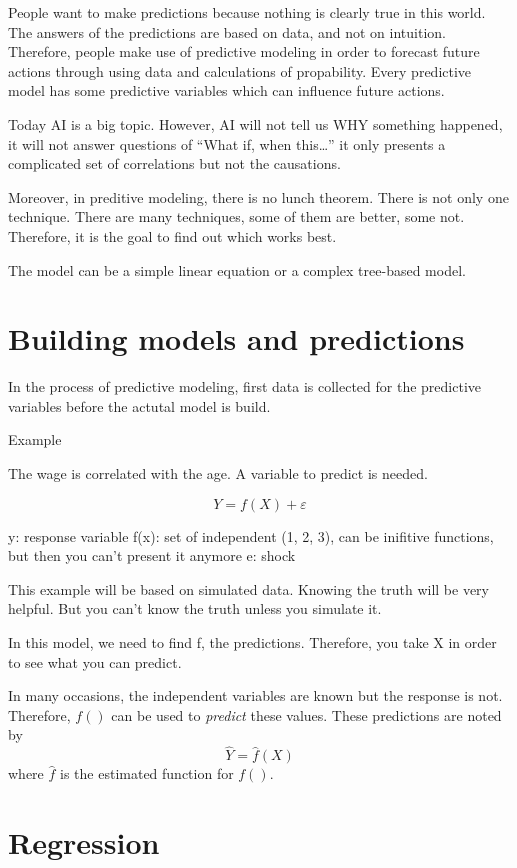 \documentclass[]{report}
\begin{document}
People want to make predictions because nothing is clearly true in this
world. The answers of the predictions are based on data, and not on
intuition. Therefore, people make use of predictive modeling in order to
forecast future actions through using data and calculations of
propability. Every predictive model has some predictive variables which
can influence future actions.

Today AI is a big topic. However, AI will not tell us WHY something
happened, it will not answer questions of ``What if, when this\ldots{}''
it only presents a complicated set of correlations but not the
causations.

Moreover, in preditive modeling, there is no lunch theorem. There is not
only one technique. There are many techniques, some of them are better,
some not. Therefore, it is the goal to find out which works best.

The model can be a simple linear equation or a complex tree-based model.

\section{Building models and
predictions}\label{building-models-and-predictions}

In the process of predictive modeling, first data is collected for the
predictive variables before the actutal model is build.

Example

The wage is correlated with the age. A variable to predict is needed.

\[Y=f(X) + \varepsilon \]

y: response variable f(x): set of independent (1, 2, 3), can be
inifitive functions, but then you can't present it anymore e: shock

This example will be based on simulated data. Knowing the truth will be
very helpful. But you can't know the truth unless you simulate it.

In this model, we need to find f, the predictions. Therefore, you take X
in order to see what you can predict.

In many occasions, the independent variables are known but the response
is not. Therefore, \(f()\) can be used to \emph{predict} these values.
These predictions are noted by \[\hat{Y}=\hat{f}(X)\] where \(\hat{f}\)
is the estimated function for \(f()\).

\section{Regression}\label{regression}
\end{document}
